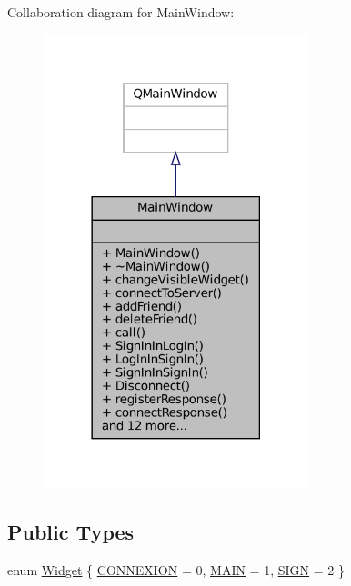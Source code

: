 Collaboration diagram for Main\+Window\+:
\nopagebreak
\begin{figure}[H]
\begin{center}
\leavevmode
\includegraphics[width=218pt]{classMainWindow__coll__graph}
\end{center}
\end{figure}
\subsection*{Public Types}
\begin{DoxyCompactItemize}
\item 
enum \mbox{\hyperlink{classMainWindow_a44e53650a12325d1ad0625dbf1ef7d98}{Widget}} \{ \mbox{\hyperlink{classMainWindow_a44e53650a12325d1ad0625dbf1ef7d98acd276e3221d91ddafcb22927b019c7dd}{C\+O\+N\+N\+E\+X\+I\+ON}} = 0, 
\mbox{\hyperlink{classMainWindow_a44e53650a12325d1ad0625dbf1ef7d98a46a33034e785546fa16e10ba40ea6978}{M\+A\+IN}} = 1, 
\mbox{\hyperlink{classMainWindow_a44e53650a12325d1ad0625dbf1ef7d98a1483d0e181a77be66f3ca0a9aca6df7b}{S\+I\+GN}} = 2
 \}
\end{DoxyCompactItemize}
